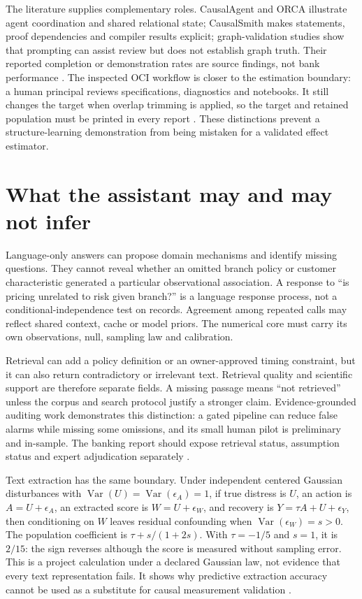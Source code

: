 The literature supplies complementary roles. CausalAgent and ORCA illustrate agent coordination and shared relational state; CausalSmith makes statements, proof dependencies and compiler results explicit; graph-validation studies show that prompting can assist review but does not establish graph truth. Their reported completion or demonstration rates are source findings, not bank performance \cite{v12_la_2602_11527,exec13_census_orca,exec13_census_causalsmith,exec13_census_graph_validation}. The inspected OCI workflow is closer to the estimation boundary: a human principal reviews specifications, diagnostics and notebooks. It still changes the target when overlap trimming is applied, so the target and retained population must be printed in every report \cite{v12_la_2607_22443}. These distinctions prevent a structure-learning demonstration from being mistaken for a validated effect estimator.

\section{What the assistant may and may not infer}

Language-only answers can propose domain mechanisms and identify missing questions. They cannot reveal whether an omitted branch policy or customer characteristic generated a particular observational association. A response to ``is pricing unrelated to risk given branch?'' is a language response process, not a conditional-independence test on records. Agreement among repeated calls may reflect shared context, cache or model priors. The numerical core must carry its own observations, null, sampling law and calibration.

Retrieval can add a policy definition or an owner-approved timing constraint, but it can also return contradictory or irrelevant text. Retrieval quality and scientific support are therefore separate fields. A missing passage means ``not retrieved'' unless the corpus and search protocol justify a stronger claim. Evidence-grounded auditing work demonstrates this distinction: a gated pipeline can reduce false alarms while missing some omissions, and its small human pilot is preliminary and in-sample. The banking report should expose retrieval status, assumption status and expert adjudication separately \cite{v12_la_2609_30867}.

Text extraction has the same boundary. Under independent centered Gaussian disturbances with $\operatorname{Var}(U)=\operatorname{Var}(\epsilon_A)=1$, if true distress is $U$, an action is $A=U+\epsilon_A$, an extracted score is $W=U+\epsilon_W$, and recovery is $Y=\tau A+U+\epsilon_Y$, then conditioning on $W$ leaves residual confounding when $\operatorname{Var}(\epsilon_W)=s>0$. The population coefficient is $\tau+s/(1+2s)$. With $\tau=-1/5$ and $s=1$, it is $2/15$: the sign reverses although the score is measured without sampling error. This is a project calculation under a declared Gaussian law, not evidence that every text representation fails. It shows why predictive extraction accuracy cannot be used as a substitute for causal measurement validation \cite{exec13_census_text_review_arxiv}.


